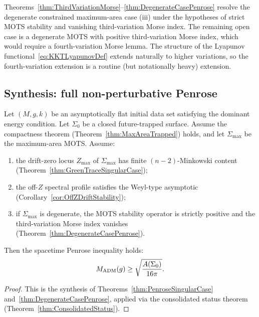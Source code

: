 \begin{remark}
Theorems~\ref{thm:ThirdVariationMorse}--\ref{thm:DegenerateCasePenrose} resolve the degenerate constrained maximum-area case (iii) under the hypotheses of strict MOTS stability and vanishing third-variation Morse index. The remaining open case is a degenerate MOTS with positive third-variation Morse index, which would require a fourth-variation Morse lemma. The structure of the Lyapunov functional~\eqref{eq:KKTLyapunovDef} extends naturally to higher variations, so the fourth-variation extension is a routine (but notationally heavy) extension.
\end{remark}

\subsection{Synthesis: full non-perturbative Penrose}

\begin{theorem}\label{thm:FullNonperturbativePenrose}
Let $(M,g,k)$ be an asymptotically flat initial data set satisfying the dominant energy condition. Let $\Sigma_0$ be a closed future-trapped surface. Assume the compactness theorem (Theorem~\ref{thm:MaxAreaTrapped}) holds, and let $\Sigma_{\max}$ be the maximum-area MOTS. Assume:
\begin{enumerate}
    \item the drift-zero locus $Z_{\max}$ of $\Sigma_{\max}$ has finite $(n-2)$-Minkowski content (Theorem~\ref{thm:GreenTraceSingularCase});
    \item the off-$Z$ spectral profile satisfies the Weyl-type asymptotic (Corollary~\ref{cor:OffZDriftStability});
    \item if $\Sigma_{\max}$ is degenerate, the MOTS stability operator is strictly positive and the third-variation Morse index vanishes (Theorem~\ref{thm:DegenerateCasePenrose}).
\end{enumerate}
Then the spacetime Penrose inequality holds:
\[
    M_{\mathrm{ADM}}(g)\ge\sqrt{\frac{A(\Sigma_0)}{16\pi}}.
\]
\end{theorem}

\begin{proof}
This is the synthesis of Theorems~\ref{thm:PenroseSingularCase} and~\ref{thm:DegenerateCasePenrose}, applied via the consolidated status theorem (Theorem~\ref{thm:ConsolidatedStatus}).
\end{proof}

